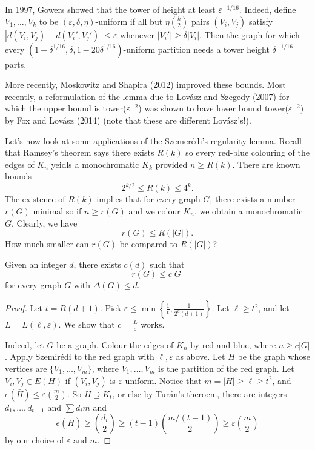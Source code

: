 \documentclass[a4paper]{article}
\begin{document}
In 1997, Gowers showed that the tower of height at least $\varepsilon^{-1/16}$. Indeed, define $V_1, \ldots, V_k$ to be $(\varepsilon, \delta, \eta)$-uniform if all but $\eta \binom{k}{2}$ pairs $(V_i, V_j)$ satisfy $|d(V_i, V_j) - d(V_i', V_j')| \leq \varepsilon$ whenever $|V_i'| \geq \delta |V_i|$. Then the graph for which every $(1 - \delta^{1/16}, \delta, 1 - 20 \delta^{1/16})$-uniform partition needs a tower height $\delta^{-1/16}$ parts.

More recently, Moskowitz and Shapira (2012) improved these bounds. Most recently, a reformulation of the lemma due to Lov\'asz and Szegedy (2007) for which the upper bound is tower($\varepsilon^{-2}$) was shown to have lower bound tower($\varepsilon^{-2}$) by Fox and Lov\'asz (2014) (note that these are different Lov\'asz's!).

Let's now look at some applications of the Szemer\'edi's regularity lemma. Recall that Ramsey's theorem says there exists $R(k)$ so every red-blue colouring of the edges of $K_n$ yeidls a monochromatic $K_k$ provided $n \geq R(k)$. There are known bounds
\[
  2^{k/2} \leq R(k) \leq 4^k.
\]
The existence of $R(k)$ implies that for every graph $G$, there exists a number $r(G)$ minimal so if $n \geq r(G)$ and we colour $K_n$, we obtain a monochromatic $G$. Clearly, we have
\[
  r(G) \leq R(|G|).
\]
How much smaller can $r(G)$ be compared to $R(|G|)$?

\begin{thm}
  Given an integer $d$, there exists $c(d)$ such that
  \[
    r(G) \leq c|G|
  \]
  for every graph $G$ with $\Delta(G) \leq d$.
\end{thm}

\begin{proof}
  Let $t = R(d + 1)$. Pick $\varepsilon \leq \min \left\{\frac{1}{t}, \frac{1}{2^d (d + 1)}\right\}$. Let $\ell \geq t^2$, and let $L = L(\ell, \varepsilon)$. We show that $c = \frac{L}{\varepsilon}$ works.

  Indeed, let $G$ be a graph. Colour the edges of $K_n$ by red and blue, where $n \geq c |G|$. Apply Szemir\'edi to the red graph with $\ell, \varepsilon$ as above. Let $H$ be the graph whose vertices are $\{V_1, \ldots, V_m\}$, where $V_1, \ldots, V_m$ is the partition of the red graph. Let $V_i, V_j \in E(H)$ if $(V_i, V_j)$ is $\varepsilon$-uniform. Notice that $m = |H| \geq \ell \geq t^2$, and $e(\bar{H}) \leq \varepsilon \binom{m}{2}$. So $H \supseteq K_t$, or else by Tur\'an's theroem, there are integers $d_1, \ldots, d_{t - 1}$ and $\sum d_i m$ and
  \[
    e(\bar{H}) \geq \binom{d_i}{2}\geq (t - 1) \binom{m/(t - 1)}{2} \geq \varepsilon \binom{m}{2}
  \]
  by our choice of $\varepsilon$ and $m$.
\end{proof}

\printindex
\end{document}
